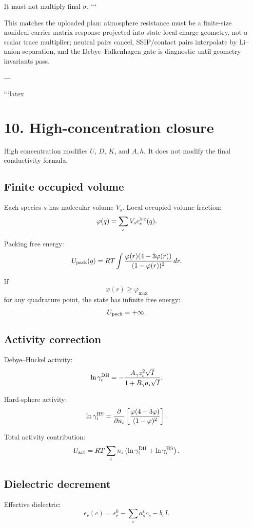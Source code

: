 It must not multiply final \(\sigma\).
```

This matches the uploaded plan: atmosphere resistance must be a finite-size nonideal carrier matrix response projected into state-local charge geometry, not a scalar trace multiplier; neutral pairs cancel, SSIP/contact pairs interpolate by Li–anion separation, and the Debye–Falkenhagen gate is diagnostic until geometry invariants pass. 

---

```latex
\section{10. High-concentration closure}

High concentration modifies \(U\), \(D\), \(K\), and \(A,h\). It does not modify
the final conductivity formula.

\subsection{Finite occupied volume}

Each species \(s\) has molecular volume \(V_s\). Local occupied volume fraction:
\[
\varphi(q)=\sum_s V_s c_s^{\rm loc}(q).
\]

Packing free energy:
\[
U_{\rm pack}(q)
=
RT
\int
\frac{\varphi(r)(4-3\varphi(r))}
{(1-\varphi(r))^2}
\,dr.
\]

If
\[
\varphi(r)\ge\varphi_{\max}
\]
for any quadrature point, the state has infinite free energy:
\[
U_{\rm pack}=+\infty.
\]

\subsection{Activity correction}

Debye--Huckel activity:
\[
\ln\gamma_i^{\rm DH}
=
-\frac{A_\gamma z_i^2\sqrt I}{1+B_\gamma a_i\sqrt I}.
\]

Hard-sphere activity:
\[
\ln\gamma_i^{\rm HS}
=
\frac{\partial}{\partial n_i}
\left[
\frac{\varphi(4-3\varphi)}{(1-\varphi)^2}
\right].
\]

Total activity contribution:
\[
U_{\rm act}
=
RT\sum_i n_i
\left(
\ln\gamma_i^{\rm DH}
+
\ln\gamma_i^{\rm HS}
\right).
\]

\subsection{Dielectric decrement}

Effective dielectric:
\[
\epsilon_r(c)
=
\epsilon_r^{0}
-
\sum_s a_s^{\epsilon}c_s
-
b_\epsilon I.
\]

